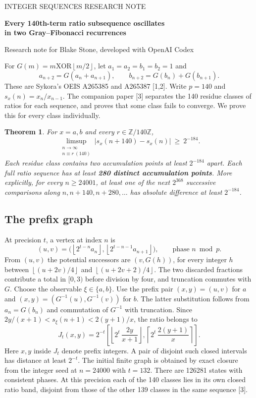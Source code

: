 \documentclass[11pt,letterpaper]{article}
\newtheorem{theorem}{Theorem}\newcommand{\fl}[1]{\left\lfloor#1\right\rfloor}
\begin{document}
{\small\sffamily\color{ink} INTEGER SEQUENCES \hfill RESEARCH NOTE}\par
{\LARGE\bfseries Every 140th-term ratio subsequence oscillates\\[2pt] in two Gray--Fibonacci recurrences}\par
{\small Research note for Blake Stone, developed with OpenAI Codex}\par
\medskip
For $G(m)=m\mathbin{\mathrm{XOR}}\fl{m/2}$, let $a_1=a_2=b_1=b_2=1$ and
\[
 a_{n+2}=G(a_n+a_{n+1}),\qquad b_{n+2}=G(b_n)+G(b_{n+1}).
\]
These are Sykora's OEIS A265385 and A265387 [1,2]. Write $p=140$ and $s_x(n)=x_n/x_{n-1}$. The companion paper [3] separates the 140 residue classes of ratios for each sequence, and proves that some class fails to converge. We prove this for every class individually.

\begin{theorem}
For $x=a,b$ and every $r\in\mathbb Z/140\mathbb Z$,
\[
 \limsup_{\substack{n\to\infty\\ n\equiv r\ (140)}}|s_x(n+140)-s_x(n)|\ \ge\ 2^{-184}.
\]
Each residue class contains two accumulation points at least $2^{-184}$ apart. Each full ratio sequence has at least \textbf{280 distinct accumulation points}. More explicitly, for every $n\ge24001$, at least one of the next $2^{368}$ successive comparisons along $n,n+140,n+280,\ldots$ has absolute difference at least $2^{-184}$.
\end{theorem}

\subsection*{The prefix graph}
At precision $t$, a vertex at index $n$ is
\[
  (u,v)=\bigl(\fl{2^{t-n}a_n},\fl{2^{t-n-1}a_{n+1}}\bigr),
  \qquad \text{phase } n\bmod p.
\]
From $(u,v)$ the potential successors are $(v,G(h))$, for every integer $h$ between $\fl{(u+2v)/4}$ and $\fl{(u+2v+2)/4}$. The two discarded fractions contribute a total in $[0,3)$ before division by four, and truncation commutes with $G$. Choose the observable $\xi\in\{a,b\}$. Use the prefix pair $(x,y)=(u,v)$ for $a$ and $(x,y)=(G^{-1}(u),G^{-1}(v))$ for $b$. The latter substitution follows from $a_n=G(b_n)$ and commutation of $G^{-1}$ with truncation. Since $2y/(x+1)<s_\xi(n+1)<2(y+1)/x$, the ratio belongs to
\[
 J_t(x,y)=2^{-t}\left[\fl{2^t\,\frac{2y}{x+1}},                    \left\lceil 2^t\,\frac{2(y+1)}{x}\right\rceil\right].
\]
Here $x,y$ inside $J_t$ denote prefix integers. A pair of disjoint such closed intervals has distance at least $2^{-t}$. The initial finite graph is obtained by exact closure from the integer seed at $n=24000$ with $t=132$. There are 126281 states with consistent phases. At this precision each of the 140 classes lies in its own closed ratio band, disjoint from those of the other 139 classes in the same sequence [3].
\end{document}
